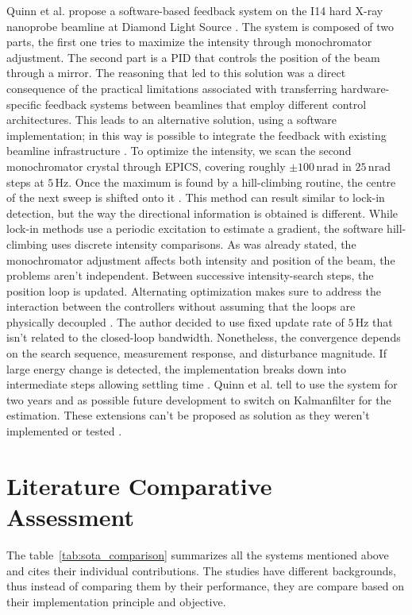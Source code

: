 Quinn et al. propose a software-based feedback system on the I14 hard X-ray nanoprobe beamline at Diamond Light Source \cite{Quinn2021}.
The system is composed of two parts, the first one tries to maximize the intensity through monochromator adjustment. The second part is a PID that controls the position of the beam through a mirror.
The reasoning that led to this solution was a direct consequence of the practical limitations associated with transferring hardware-specific feedback systems between beamlines that employ different control architectures.
This leads to an alternative solution, using a software implementation; in this way is possible to integrate the feedback with existing beamline infrastructure \cite{Quinn2021}.
To optimize the intensity, we scan the second monochromator crystal through EPICS, covering roughly $\pm100\,\mathrm{nrad}$ in $25\,\mathrm{nrad}$ steps at $5\,\mathrm{Hz}$. 
Once the maximum is found by a hill-climbing routine, the centre of the next sweep is shifted onto it \cite{Quinn2021}.
This method can result similar to lock-in detection, but the way the directional information is obtained is different.
While lock-in methods use a periodic excitation to estimate a gradient, the software hill-climbing uses discrete intensity comparisons.
As was already stated, the monochromator adjustment affects both intensity and position of the beam, the problems aren't independent.
Between successive intensity-search steps, the position loop is updated.
Alternating optimization makes sure to address the interaction between the controllers without assuming that the loops are physically decoupled \cite{Quinn2021}.
The author decided to use fixed update rate of $5\,\mathrm{Hz}$ that isn't related to the closed-loop bandwidth.
Nonetheless, the convergence depends on the search sequence, measurement response, and disturbance magnitude.
If large energy change is detected, the implementation breaks down into intermediate steps allowing settling time \cite{Quinn2021}.
Quinn et al. tell to use the system for two years and as possible future development to switch on Kalmanfilter for the estimation.
These extensions can't be proposed as solution as they weren't implemented or tested \cite{Quinn2021}.

\section{Literature Comparative Assessment}

The table~\ref{tab:sota_comparison} summarizes all the systems mentioned above and cites their individual contributions.
The studies have different backgrounds, thus instead of comparing them by their performance, they are compare based on their implementation principle and objective. 

